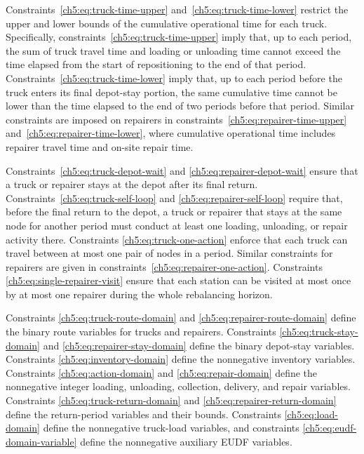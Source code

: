 Constraints~\eqref{ch5:eq:truck-time-upper} and~\eqref{ch5:eq:truck-time-lower}
restrict the upper and lower bounds of the cumulative operational time for each
truck. Specifically, constraints~\eqref{ch5:eq:truck-time-upper} imply that, up to
each period, the sum of truck travel time and loading or unloading time cannot
exceed the time elapsed from the start of repositioning to the end of that
period. Constraints~\eqref{ch5:eq:truck-time-lower} imply that, up to each period
before the truck enters its final depot-stay portion, the same cumulative time
cannot be lower than the time elapsed to the end of two periods before that
period. Similar constraints are imposed on repairers in
constraints~\eqref{ch5:eq:repairer-time-upper} and~\eqref{ch5:eq:repairer-time-lower},
where cumulative operational time includes repairer travel time and on-site
repair time.

Constraints~\eqref{ch5:eq:truck-depot-wait} and
\eqref{ch5:eq:repairer-depot-wait} ensure that a truck or repairer stays at the
depot after its final return. Constraints~\eqref{ch5:eq:truck-self-loop} and
\eqref{ch5:eq:repairer-self-loop} require that, before the final return to the
depot, a truck or repairer that stays at the same node for another period must
conduct at least one loading, unloading, or repair activity there. Constraints
\eqref{ch5:eq:truck-one-action} enforce that each truck can travel between at most
one pair of nodes in a period. Similar constraints for repairers are given in
constraints~\eqref{ch5:eq:repairer-one-action}. Constraints
\eqref{ch5:eq:single-repairer-visit} ensure that each station can be visited at most
once by at most one repairer during the whole rebalancing horizon.

Constraints \eqref{ch5:eq:truck-route-domain} and
\eqref{ch5:eq:repairer-route-domain} define the binary route variables for
trucks and repairers. Constraints \eqref{ch5:eq:truck-stay-domain} and
\eqref{ch5:eq:repairer-stay-domain} define the binary depot-stay variables.
Constraints \eqref{ch5:eq:inventory-domain} define the nonnegative inventory
variables. Constraints \eqref{ch5:eq:action-domain} and
\eqref{ch5:eq:repair-domain} define the nonnegative integer loading, unloading,
collection, delivery, and repair variables. Constraints
\eqref{ch5:eq:truck-return-domain} and \eqref{ch5:eq:repairer-return-domain}
define the return-period variables and their bounds. Constraints
\eqref{ch5:eq:load-domain} define the nonnegative truck-load variables, and
constraints \eqref{ch5:eq:eudf-domain-variable} define the nonnegative auxiliary
EUDF variables.

